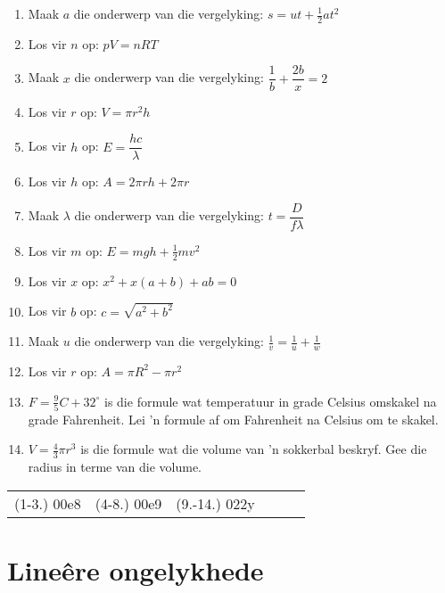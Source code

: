 \begin{exercises}{}
{
\begin{enumerate}[itemsep=5pt, label=\textbf{\arabic*}. ] 
\item Maak $a$ die onderwerp van die vergelyking: $s=ut+\frac{1}{2}at^{2}$
\item Los vir $n$ op: $pV=nRT$  
\item Maak $x$ die onderwerp van die vergelyking: $\dfrac{1}{b}+\dfrac{2b}{x}=2$
\item Los vir $r$ op: $V = \pi r^{2} h$ 
\item Los vir $h$ op: $E=\dfrac{hc}{\lambda}$ 
\item Los vir $h$ op: $A=2\pi rh + 2 \pi r$ 
\item Maak $\lambda$ die onderwerp van die vergelyking: $t=\dfrac{D}{f \lambda}$
\item Los vir $m$ op: $E=mgh + \frac{1}{2}mv^{2}$ 
\item Los vir $x$ op: $x^2+x(a+b)+ab=0$ 
\item Los vir $b$ op: $c=\sqrt{a^2+b^2}$ 
\item Maak $u$ die onderwerp van die vergelyking: $\frac{1}{v}=\frac{1}{u}+\frac{1}{w}$
\item Los vir $r$ op: $A=\pi R^2 -\pi r^2$  
\item $F=\frac{9}{5}C + 32^\circ$ is die formule wat temperatuur in grade Celsius omskakel na grade Fahrenheit. Lei 'n formule af om Fahrenheit na Celsius om te skakel.

\item $V=\frac{4}{3}\pi r^3$  is die formule wat die volume van 'n sokkerbal beskryf. Gee die radius in terme van die volume.
\end{enumerate}
\practiceinfo
\par 
\par \begin{tabular}[h]{cccccc}
(1-3.) 00e8&   (4-8.) 00e9 & (9.-14.) 022y\end{tabular}
}
\end{exercises}



\section{Lineêre ongelykhede}
\nopagebreak



